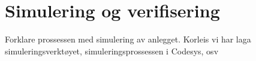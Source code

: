 \chapter{Simulering og verifisering}
\thispagestyle{fancy}

Forklare prossessen med simulering av anlegget. Korleis vi har laga simuleringsverktøyet, simuleringsprossessen i Codesys, osv